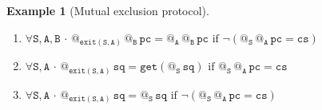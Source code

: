 \documentclass{article}
\makeatletter
\newcommand{\B}{\mathtt{B}}
\newcommand{\A}{\mathtt{A}}
\renewcommand{\S}{\mathtt{S}}
\newcommand{\pc}{{\mathtt{pc}}}
\newcommand{\sq}{{\mathtt{sq}}}
\newcommand{\cs}{{\mathtt{cs}}}
\newcommand{\exit}{{\mathtt{exit}}}
\newcommand{\get}{{\mathtt{get}}}
\newcommand{\at}[1]{@_{#1}\,}
\newcommand{\Forall}[1]{\forall #1\,{\cdot}\,}
\newtheorem{example}{Example}
\makeatother
\begin{document}
\begin{example} [Mutual exclusion protocol]
\begin{enumerate}[label=(\arabic*),leftmargin=*]
 \item $\Forall{\S, \A,\B}  \at{\exit(\S,\A) }\at{\B}\pc =  \at{\A }\at{\B}\pc \text{ if } \neg(\at{\S} \at{\A} \pc = \cs)$
 
 \item $\Forall{\S,\A} \at{\exit(\S,\A)}\sq = \get (\at{\S}\sq) \text{ if } \at{\S}\at{\A} \pc = \cs$
 
  \item $\Forall{\S,\A} \at{\exit(\S,\A)}\sq = \at{\S}\sq \text{ if } \neg(\at{\S}\at{\A} \pc = \cs)$
 \end{enumerate}
 
 \end{example}
\end{document}
